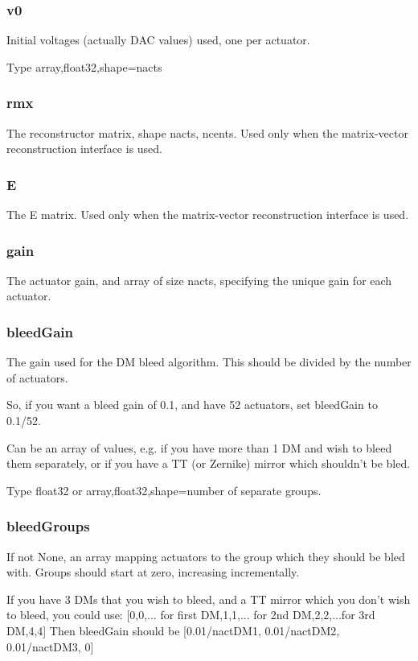 \documentclass[a4,10pt]{article}
\begin{document}
\subsubsection{v0}
Initial voltages (actually DAC values) used, one per actuator.

Type array,float32,shape=nacts

\subsubsection{rmx}
The reconstructor matrix, shape nacts, ncents.  Used only when the
matrix-vector reconstruction interface is used.

\subsubsection{E}
The E matrix.  Used only when the
matrix-vector reconstruction interface is used.

\subsubsection{gain}
The actuator gain, and array of size nacts, specifying the unique gain for
each actuator.  

\subsubsection{bleedGain}
The gain used for the DM bleed algorithm.  This should be divided by
the number of actuators.

So, if you want a bleed gain of 0.1, and have 52 actuators, set
bleedGain to 0.1/52.

Can be an array of values, e.g. if you have more than 1 DM and wish to
bleed them separately, or if you have a TT (or Zernike) mirror which
shouldn't be bled.

Type float32 or array,float32,shape=number of separate groups.

\subsubsection{bleedGroups}
If not None, an array mapping actuators to the group which they should
be bled with.  Groups should start at zero, increasing incrementally.

If you have 3 DMs that you wish to bleed, and a TT mirror which you
don't wish to bleed, you could use:
[0,0,... for first DM,1,1,... for 2nd DM,2,2,...for 3rd DM,4,4]
Then bleedGain should be [0.01/nactDM1, 0.01/nactDM2, 0.01/nactDM3, 0]
\end{document}
